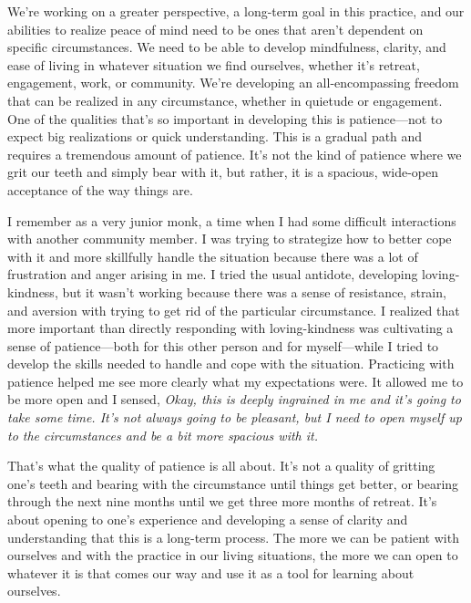 We're working on a greater perspective, a long-term goal in this 
practice, and our abilities to realize peace of mind need to be ones 
that aren't dependent on specific circumstances. We need to be able to 
develop mindfulness, clarity, and ease of living in whatever situation 
we find ourselves, whether it's retreat, engagement, work, or 
community. We're developing an all-encompassing freedom that can be 
realized in any circumstance, whether in quietude or engagement. One of 
the qualities that's so important in developing this is patience---not 
to expect big realizations or quick understanding. This is a gradual 
path and requires a tremendous amount of patience. It's not the kind of 
patience where we grit our teeth and simply bear with it, but rather, 
it is a spacious, wide-open acceptance of the way things are.

I remember as a very junior monk, a time when I had some difficult 
interactions with another community member. I was trying to strategize 
how to better cope with it and more skillfully handle the situation 
because there was a lot of frustration and anger arising in me. I tried 
the usual antidote, developing loving-kindness, but it wasn't working 
because there was a sense of resistance, strain, and aversion with 
trying to get rid of the particular circumstance. I realized that more 
important than directly responding with loving-kindness was cultivating 
a sense of patience---both for this other person and for myself---while 
I tried to develop the skills needed to handle and cope with the 
situation. Practicing with patience helped me see more clearly what my 
expectations were. It allowed me to be more open and I sensed, 
\emph{Okay, this is deeply ingrained in me and it's going to take some 
time. It's not always going to be pleasant, but I need to open myself 
up to the circumstances and be a bit more spacious with it.}

That's what the quality of patience is all about. It's not a quality of 
gritting one's teeth and bearing with the circumstance until things get 
better, or bearing through the next nine months until we get three more 
months of retreat. It's about opening to one's experience and 
developing a sense of clarity and understanding that this is a 
long-term process. The more we can be patient with ourselves and with 
the practice in our living situations, the more we can open to whatever 
it is that comes our way and use it as a tool for learning about 
ourselves.


